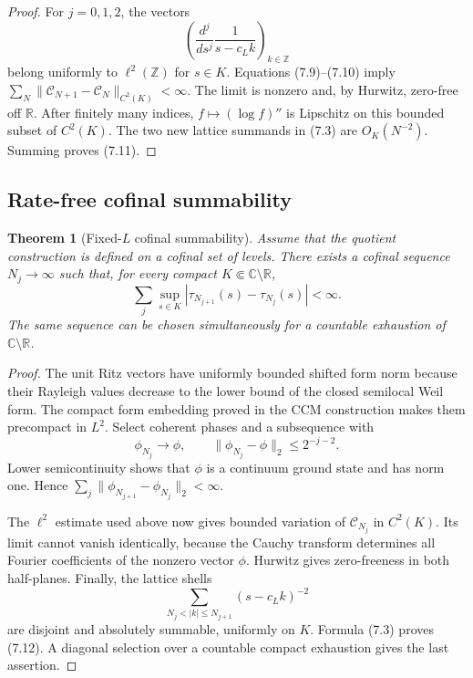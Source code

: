 \documentclass[11pt]{amsart}
\newtheorem{theorem}{Theorem}[section]
\theoremstyle{definition}
\theoremstyle{remark}
\newcommand{\C}{\mathbb C}
\newcommand{\R}{\mathbb R}
\begin{document}
\begin{proof}
For \(j=0,1,2\), the vectors
\[
 \left(\frac{d^j}{ds^j}\frac1{s-c_Lk}\right)_{k\in\mathbb Z}
\]
belong uniformly to \(\ell^2(\mathbb Z)\) for \(s\in K\).  Equations
(7.9)--(7.10) imply
\(\sum_N\|\mathcal C_{N+1}-\mathcal C_N\|_{C^2(K)}<\infty\).
The limit is nonzero and, by Hurwitz, zero-free off \(\R\).  After finitely
many indices, \(f\mapsto(\log f)''\) is Lipschitz on this bounded subset of
\(C^2(K)\).  The two new lattice summands in (7.3) are \(O_K(N^{-2})\).
Summing proves (7.11).
\end{proof}

\subsection{Rate-free cofinal summability}

\begin{theorem}[Fixed-\(L\) cofinal summability]
Assume that the quotient construction is defined on a cofinal set of
levels.  There exists a cofinal sequence \(N_j\to\infty\) such that, for
every compact \(K\Subset\C\setminus\R\),
\[
\boxed{
 \sum_j\sup_{s\in K}
 |\tau_{N_{j+1}}(s)-\tau_{N_j}(s)|<\infty.}
\tag{7.12}
\]
The same sequence can be chosen simultaneously for a countable exhaustion
of \(\C\setminus\R\).
\end{theorem}

\begin{proof}
The unit Ritz vectors have uniformly bounded shifted form norm because
their Rayleigh values decrease to the lower bound of the closed semilocal
Weil form.  The compact form embedding proved in the CCM construction makes
them precompact in \(L^2\).  Select coherent phases and a subsequence with
\[
 \phi_{N_j}\to\phi,\qquad
 \|\phi_{N_j}-\phi\|_2\le2^{-j-2}.
\tag{7.13}
\]
Lower semicontinuity shows that \(\phi\) is a continuum ground state and
has norm one.  Hence
\(\sum_j\|\phi_{N_{j+1}}-\phi_{N_j}\|_2<\infty\).

The \(\ell^2\) estimate used above now gives bounded variation of
\(\mathcal C_{N_j}\) in \(C^2(K)\).  Its limit cannot vanish identically,
because the Cauchy transform determines all Fourier coefficients of the
nonzero vector \(\phi\).  Hurwitz gives zero-freeness in both half-planes.
Finally, the lattice shells
\[
 \sum_{N_j<|k|\le N_{j+1}}(s-c_Lk)^{-2}
\]
are disjoint and absolutely summable, uniformly on \(K\).  Formula (7.3)
proves (7.12).  A diagonal selection over a countable compact exhaustion
gives the last assertion.
\end{proof}
\end{document}
